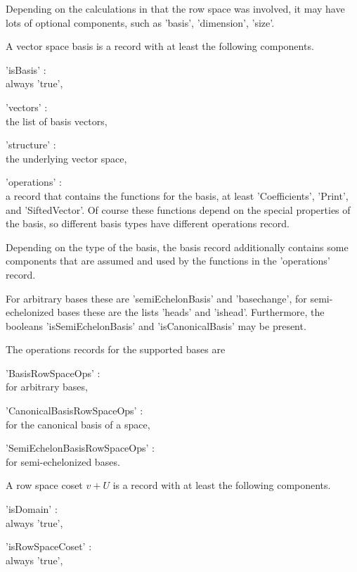 Depending on the calculations in that the row space was involved, it may
have lots of optional components, such as 'basis', 'dimension', 'size'.


A vector space basis is a record with at least the following components.

'isBasis' : \\
    always 'true',

'vectors' : \\
    the list of basis vectors,

'structure' : \\
    the underlying vector space,

'operations' : \\
    a record that contains the functions for the basis, at least
    'Coefficients', 'Print', and 'SiftedVector'.
    Of course these functions depend on the special properties of the
    basis, so different basis types have different operations record.

Depending on the type of the basis, the basis record additionally contains
some components that are assumed and used by the functions in the
'operations' record.

For arbitrary bases these are 'semiEchelonBasis' and 'basechange',
for semi-echelonized bases these are the lists 'heads' and 'ishead'.
Furthermore, the booleans 'isSemiEchelonBasis' and 'isCanonicalBasis' may
be present.

The operations records for the supported bases are

'BasisRowSpaceOps' : \\
    for arbitrary bases,

'CanonicalBasisRowSpaceOps' : \\
    for the canonical basis of a space,

'SemiEchelonBasisRowSpaceOps' : \\
    for semi-echelonized bases.


A row space coset $v + U$ is a record with at least the following components.

'isDomain' : \\
    always 'true',

'isRowSpaceCoset' : \\
    always 'true',

